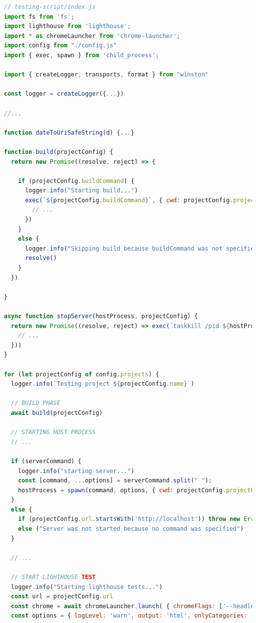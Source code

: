 \documentclass[a4paper, 10pt]{article}
\begin{document}
\begin{lstlisting}[caption={Automation script for Lighthouse tests}, language=JavaScript, label={lst:lighthouse-script}]
// testing-script/index.js
import fs from 'fs';
import lighthouse from 'lighthouse';
import * as chromeLauncher from 'chrome-launcher';
import config from "./config.js"
import { exec, spawn } from 'child_process';

import { createLogger, transports, format } from "winston"

const logger = createLogger({...})

//...

function dateToUriSafeString(d) {...}

function build(projectConfig) {
  return new Promise((resolve, reject) => {

    if (projectConfig.buildCommand) {
      logger.info("Starting build...")
      exec(`${projectConfig.buildCommand}`, { cwd: projectConfig.projectPath, maxBuffer: 1024 * 1024 * 1024 }, (error, stdout, stderr) => {
        // ...
      })
    }
    else {
      logger.info("Skipping build because buildCommand was not specified")
      resolve()
    }
  })

}

async function stopServer(hostProcess, projectConfig) {
  return new Promise((resolve, reject) => exec(`taskkill /pid ${hostProcess.pid} /f /t`, (error, stdout, stderr) => {
    // ...
  }))
}

for (let projectConfig of config.projects) {
  logger.info(`Testing project ${projectConfig.name}`)

  // BUILD PHASE
  await build(projectConfig)

  // STARTING HOST PROCESS
  // ...

  if (serverCommand) {
    logger.info("starting server...")
    const [command, ...options] = serverCommand.split(" ");
    hostProcess = spawn(command, options, { cwd: projectConfig.projectPath, shell: true })
  }
  else {
    if (projectConfig.url.startsWith('http://localhost')) throw new Error("Server was not properly configured. Check prefferedServeCommand, hostCommand and/or serveCommand for project", projectConfig.name)
    else ("Server was not started because no command was specified")
  }

  // ...

  // START LIGHTHOUSE TEST
  logger.info("Starting lighthouse tests...")
  const url = projectConfig.url
  const chrome = await chromeLauncher.launch( { chromeFlags: ['--headless'] } );
  const options = { logLevel: 'warn', output: 'html', onlyCategories: ['performance'], port: chrome.port, ignoreStatusCode: true };


\end{lstlisting}
\end{document}
